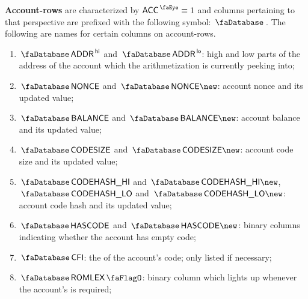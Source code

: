 \textbf{Account-rows} are characterized by $\peekAccount \equiv 1$ and columns pertaining to that perspective are prefixed with the following symbol: $\accountSignifier$. The following are names for certain columns on account-rows.
\begin{enumerate}
	\item $\accAddress\high$ and $\accAddress\low$:
		high and low parts of the address of the account which the arithmetization is currently peeking into;
	\item $\accNonce$ and $\accNonce\new$:
		account nonce and its updated value;
	\item $\accBalance$ and $\accBalance\new$:
		account balance and its updated value;
	\item $\accCodesize$ and $\accCodesize\new$:
		account code size and its updated value;
	\item $\accCodehashHi$ and $\accCodehashHi\new$, $\accCodehashLo$ and $\accCodehashLo\new$:
		account code hash and its updated value;
	\item $\accHasCode$ and $\accHasCode\new$:
		binary columns indicating whether the account has empty code;
	\item $\accCfi$:
		the \CFI{} of the account's code; only listed if necessary;
	\item $\accRomLexFlag$:
		binary column which lights up whenever the account's \CFI{} is required;
\end{enumerate}

